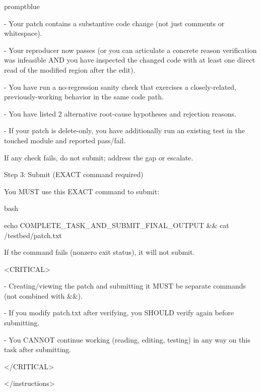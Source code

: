 \begin{promptbox}{promptblue}
{- Your patch contains a substantive code change (not just comments or whitespace).\par
- Your reproducer now passes (or you can articulate a concrete reason verification was infeasible AND you have inspected the changed code with at least one direct read of the modified region after the edit).\par
- You have run a no-regression sanity check that exercises a closely-related, previously-working behavior in the same code path.\par
- You have listed 2 alternative root-cause hypotheses and rejection reasons.\par
- If your patch is delete-only, you have additionally run an existing test in the touched module and reported pass/fail.\par
\vspace{0.35em}\par
If any check fails, do not submit; address the gap or escalate.\par
\vspace{0.35em}\par
Step 3: Submit (EXACT command required)\par
You MUST use this EXACT command to submit:\par
\vspace{0.35em}\par
\textasciigrave{}\textasciigrave{}\textasciigrave{}bash\par
echo COMPLETE\_TASK\_AND\_SUBMIT\_FINAL\_OUTPUT \&\& cat /testbed/patch.txt\par
\textasciigrave{}\textasciigrave{}\textasciigrave{}\par
\vspace{0.35em}\par
If the command fails (nonzero exit status), it will not submit.\par
\vspace{0.35em}\par
\textless{}CRITICAL\textgreater{}\par
- Creating/viewing the patch and submitting it MUST be separate commands (not combined with \&\&).\par
- If you modify patch.txt after verifying, you SHOULD verify again before submitting.\par
- You CANNOT continue working (reading, editing, testing) in any way on this task after submitting.\par
\textless{}/CRITICAL\textgreater{}\par
\textless{}/instructions\textgreater{}\par
}
\end{promptbox}

